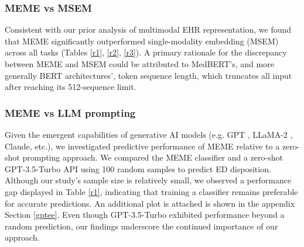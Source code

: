 \documentclass{article}
\theoremstyle{plain}
\theoremstyle{definition}
\theoremstyle{remark}
\begin{document}
\subsubsection{MEME vs MSEM}
{Consistent with our prior analysis of multimodal EHR representation, we found that MEME significantly outperformed single-modality embedding (MSEM) across all tasks (Tables \ref{r1}, \ref{r2}, \ref{r3}). A primary rationale for the discrepancy between MEME and MSEM could be attributed to MedBERT's, and more generally BERT architectures', token sequence length, which truncates all input after reaching its 512-sequence limit.

\subsubsection{MEME vs LLM prompting}


{Given the emergent capabilities of generative AI models (e.g. GPT \citep{radford2018improving}, LLaMA-2 \citep{touvron2023llama}, Claude, etc.), we investigated predictive performance of MEME relative to a zero-shot prompting approach.} {We compared the} MEME classifier and a zero-shot GPT-3.5-Turbo API using 100 random samples to predict ED disposition. Although our study's sample size is relatively small, we observed a performance gap displayed in Table \ref{r1}, indicating that training a classifier remains preferable for accurate predictions. An additional plot is attached is shown in the appendix Section \ref{gptee}. Even though GPT-3.5-Turbo exhibited performance beyond a random prediction, our findings underscore the continued importance of our approach.

}
\end{document}
